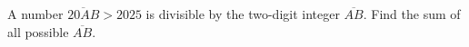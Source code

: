 A number $\overline{20 AB}>2025$ is divisible by the two-digit integer $\overline{AB}$. Find the sum of all possible $\overline{AB}$.
